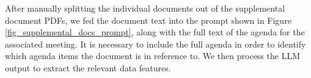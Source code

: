 After manually splitting the individual documents out of the supplemental document PDFs, we fed the document text into the prompt shown in Figure \ref{fig_supplemental_docs_prompt}, along with the full text of the agenda for the associated meeting. It is necessary to include the full agenda in order to identify which agenda items the document is in reference to. We then process the LLM output to extract the relevant data features.



